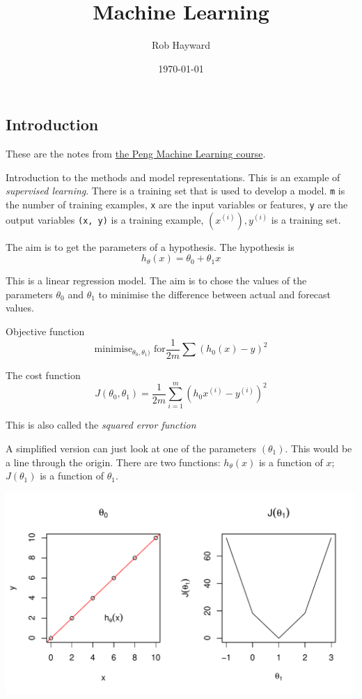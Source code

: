 \documentclass[12pt, a4paper, oneside]{article}\usepackage[]{graphicx}\usepackage[]{color}
\makeatletter
\def\maxwidth{ %
  \ifdim\Gin@nat@width>\linewidth
    \linewidth
  \else
    \Gin@nat@width
  \fi
}
\newenvironment{knitrout}{}{} %
\makeatother
\begin{document}
\title{Machine Learning}
\author{Rob Hayward}
\date{\today}
\maketitle
\subsection*{Introduction}
These are the notes from  \href{https://class.coursera.org/ml-006}{the Peng Machine Learning course}. 

Introduction to the methods and model representations.  This is an example of \emph{supervised learning}.  There is a training set that is used to develop a model.  \lstinline{m} is the number  of training examples, \lstinline{x} are the input variables or features, \lstinline{y} are the output variables \lstinline{(x, y)} is a training example, $(x^{(i)}), 
y^{(i)}$ is a training set.

The aim is to get the parameters of a hypothesis.  The hypothesis is 
\begin{equation}
h_{\theta}(x) = \theta_0 + \theta_1 x
\end{equation}

This is a linear regression model. The aim is to chose the values of the parameters $\theta_0$ and $\theta_1$ to minimise the difference between actual and forecast values. 

Objective function
\begin{equation}
\text{minimise}_{\theta_0, \theta_1)} \text{   for} \frac{1}{2m} \sum (h_0(x) - y)^2
\end{equation}

The cost function
\begin{equation}
J(\theta_0, \theta_1) = \frac{1}{2m} \sum_{i = 1}^m (h_0 x^{(i)} - y^{(i)})^2
\end{equation}

This is also called the \emph{squared error function}

A simplified version can just look at one of the parameters $(\theta_1)$.  This would be a line through the origin. There are two functions:  $h_{\theta}(x)$ is a function of $x$; $J(\theta_1)$ is a function of $\theta_1$.  

\begin{knitrout}
\color{fgcolor}
\includegraphics[width=\maxwidth]{figure/cost} 

\end{knitrout}
\end{document}
